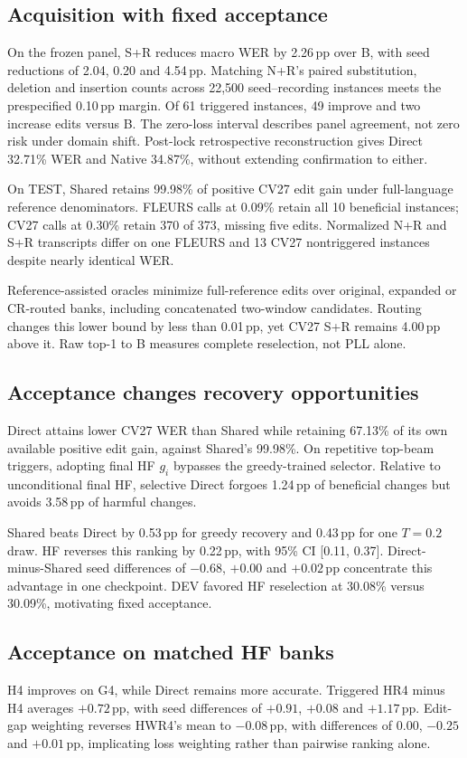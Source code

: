 \subsection{Acquisition with fixed acceptance}

On the frozen panel, S+R reduces macro WER by 2.26\,pp over B, with seed reductions of 2.04, 0.20 and 4.54\,pp. Matching N+R's paired substitution, deletion and insertion counts across 22,500 seed--recording instances meets the prespecified 0.10\,pp margin. Of 61 triggered instances, 49 improve and two increase edits versus B. The zero-loss interval describes panel agreement, not zero risk under domain shift. Post-lock retrospective reconstruction gives Direct 32.71\% WER and Native 34.87\%, without extending confirmation to either.

\newpage
On TEST, Shared retains 99.98\% of positive CV27 edit gain under full-language reference denominators. FLEURS calls at 0.09\% retain all 10 beneficial instances; CV27 calls at 0.30\% retain 370 of 373, missing five edits. Normalized N+R and S+R transcripts differ on one FLEURS and 13 CV27 nontriggered instances despite nearly identical WER.

Reference-assisted oracles minimize full-reference edits over original, expanded or CR-routed banks, including concatenated two-window candidates. Routing changes this lower bound by less than 0.01\,pp, yet CV27 S+R remains 4.00\,pp above it. Raw top-1 to B measures complete reselection, not PLL alone.

\subsection{Acceptance changes recovery opportunities}
Direct attains lower CV27 WER than Shared while retaining 67.13\% of its own available positive edit gain, against Shared's 99.98\%. On repetitive top-beam triggers, adopting final HF $g_i$ bypasses the greedy-trained selector. Relative to unconditional final HF, selective Direct forgoes 1.24\,pp of beneficial changes but avoids 3.58\,pp of harmful changes.

Shared beats Direct by 0.53\,pp for greedy recovery and 0.43\,pp for one $T=0.2$ draw. HF reverses this ranking by 0.22\,pp, with 95\% CI [0.11, 0.37]. Direct-minus-Shared seed differences of $-0.68$, $+0.00$ and $+0.02$\,pp concentrate this advantage in one checkpoint. DEV favored HF reselection at 30.08\% versus 30.09\%, motivating fixed acceptance.

\subsection{Acceptance on matched HF banks}

H4 improves on G4, while Direct remains more accurate. Triggered HR4 minus H4 averages $+0.72$\,pp, with seed differences of $+0.91$, $+0.08$ and $+1.17$\,pp. Edit-gap weighting reverses HWR4's mean to $-0.08$\,pp, with differences of $0.00$, $-0.25$ and $+0.01$\,pp, implicating loss weighting rather than pairwise ranking alone.

